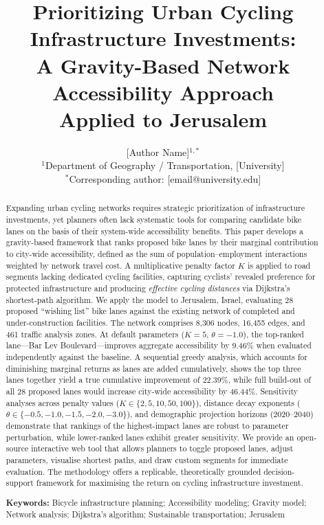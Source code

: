 \documentclass[12pt,a4paper]{article}
\title{\textbf{Prioritizing Urban Cycling Infrastructure Investments:\\ A Gravity-Based Network Accessibility Approach\\ Applied to Jerusalem}}
\author{
    [Author Name]$^{1,*}$ \\[0.5em]
    \small $^{1}$Department of Geography / Transportation, [University] \\
    \small $^{*}$Corresponding author: [email@university.edu]
}
\date{}
\begin{document}
\maketitle

\begin{abstract}
\noindent
Expanding urban cycling networks requires strategic prioritization of infrastructure investments, yet planners often lack systematic tools for comparing candidate bike lanes on the basis of their system-wide accessibility benefits. This paper develops a gravity-based framework that ranks proposed bike lanes by their marginal contribution to city-wide accessibility, defined as the sum of population--employment interactions weighted by network travel cost. A multiplicative penalty factor $K$ is applied to road segments lacking dedicated cycling facilities, capturing cyclists' revealed preference for protected infrastructure and producing \emph{effective cycling distances} via Dijkstra's shortest-path algorithm. We apply the model to Jerusalem, Israel, evaluating 28 proposed ``wishing list'' bike lanes against the existing network of completed and under-construction facilities. The network comprises 8{,}306 nodes, 16{,}455 edges, and 461 traffic analysis zones. At default parameters ($K = 5$, $\theta = -1.0$), the top-ranked lane---Bar Lev Boulevard---improves aggregate accessibility by 9.46\% when evaluated independently against the baseline. A sequential greedy analysis, which accounts for diminishing marginal returns as lanes are added cumulatively, shows the top three lanes together yield a true cumulative improvement of 22.39\%, while full build-out of all 28 proposed lanes would increase city-wide accessibility by 46.44\%. Sensitivity analyses across penalty values ($K \in \{2, 5, 10, 50, 100\}$), distance decay exponents ($\theta \in \{-0.5, -1.0, -1.5, -2.0, -3.0\}$), and demographic projection horizons (2020--2040) demonstrate that rankings of the highest-impact lanes are robust to parameter perturbation, while lower-ranked lanes exhibit greater sensitivity. We provide an open-source interactive web tool that allows planners to toggle proposed lanes, adjust parameters, visualise shortest paths, and draw custom segments for immediate evaluation. The methodology offers a replicable, theoretically grounded decision-support framework for maximising the return on cycling infrastructure investment.

\vspace{1em}
\noindent\textbf{Keywords:} Bicycle infrastructure planning; Accessibility modeling; Gravity model; Network analysis; Dijkstra's algorithm; Sustainable transportation; Jerusalem
\end{abstract}
\end{document}
